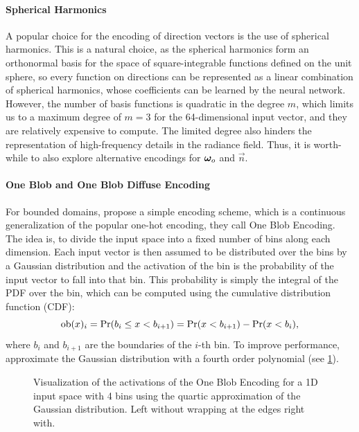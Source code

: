 \paragraph{Spherical Harmonics}
A popular choice for the encoding of direction vectors is the use of spherical harmonics.
This is a natural choice, as the spherical harmonics form an orthonormal basis for the space of square-integrable functions defined on the unit sphere, so every function on directions can be represented as a linear combination of spherical harmonics, whose coefficients can be learned by the neural network.
However, the number of basis functions is quadratic in the degree $m$, which limits us to a maximum degree of $m=3$ for the 64-dimensional input vector, and they are relatively expensive to compute.
The limited degree also hinders the representation of high-frequency details in the radiance field.
Thus, it is worth-while to also explore alternative encodings for ${\bm{\omega}_o}$ and $\vec{n}$.

\paragraph{One Blob and One Blob Diffuse Encoding}
For bounded domains, \textcite{muller2019} propose a simple encoding scheme, which is a continuous generalization of the popular one-hot encoding, they call One Blob Encoding.
The idea is, to divide the input space into a fixed number of bins along each dimension.
Each input vector is then assumed to be distributed over the bins by a Gaussian distribution and the activation of the bin is the probability of the input vector to fall into that bin.
This probability is simply the integral of the PDF over the bin, which can be computed using the cumulative distribution function (CDF):
\begin{equation}
    \mathrm{ob}(x)_i = \mathrm{Pr}(b_i \leq x < b_{i+1}) = \mathrm{Pr}(x < b_{i+1}) - \mathrm{Pr}(x < b_i),
\end{equation}
where $b_i$ and $b_{i+1}$ are the boundaries of the $i$-th bin.
To improve performance, \textcite{muller2021} approximate the Gaussian distribution with a fourth order polynomial (see \cref{fig:oneblob}).

\begin{figure}[htb!]
    \centering
    \begin{subfigure}{0.5\textwidth}
        \centering
        
    \end{subfigure}%
    \begin{subfigure}{0.5\textwidth}
        \centering
        
    \end{subfigure}
    \caption{Visualization of the activations of the One Blob Encoding for a 1D input space with 4 bins using the quartic approximation of the Gaussian distribution. Left without wrapping at the edges right with.}
    \label{fig:oneblob}
\end{figure}

